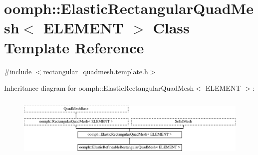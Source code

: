 \hypertarget{classoomph_1_1ElasticRectangularQuadMesh}{}\section{oomph\+:\+:Elastic\+Rectangular\+Quad\+Mesh$<$ E\+L\+E\+M\+E\+NT $>$ Class Template Reference}
\label{classoomph_1_1ElasticRectangularQuadMesh}


{\ttfamily \#include $<$rectangular\+\_\+quadmesh.\+template.\+h$>$}

Inheritance diagram for oomph\+:\+:Elastic\+Rectangular\+Quad\+Mesh$<$ E\+L\+E\+M\+E\+NT $>$\+:\begin{figure}[H]
\begin{center}
\leavevmode
\includegraphics[height=3.010753cm]{classoomph_1_1ElasticRectangularQuadMesh}
\end{center}
\end{figure}
